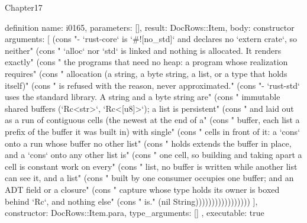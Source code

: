 \begin{lexlean}{Chapter17}
\begin{semanticmodule}
definition{
  name: i0165,
  parameters: [],
  result: DocRows::Item,
  body: constructor{
    arguments: [
      (cons "- `rust-core` is `#![no_std]` and declares no `extern crate`, so neither" (cons "  `alloc` nor `std` is linked and nothing is allocated. It renders exactly" (cons "  the programs that need no heap: a program whose realization requires" (cons "  allocation (a string, a byte string, a list, or a type that holds itself)" (cons "  is refused with the reason, never approximated." (cons "- `rust-std` uses the standard library. A string and a byte string are" (cons "  immutable shared buffers (`Rc<str>`, `Rc<[u8]>`); a list is persistent" (cons "  and laid out as a run of contiguous cells (the newest at the end of a" (cons "  buffer, each list a prefix of the buffer it was built in) with single" (cons "  cells in front of it: a `cons` onto a run whose buffer no other list" (cons "  holds extends the buffer in place, and a `cons` onto any other list is" (cons "  one cell, so building and taking apart a cell is constant work on every" (cons "  list, no buffer is written while another list can see it, and a list" (cons "  built by one consumer occupies one buffer; and an ADT field or a closure" (cons "  capture whose type holds its owner is boxed behind `Rc`, and nothing else" (cons "  is." (nil String)))))))))))))))))
    ],
    constructor: DocRows::Item.para,
    type_arguments: []
  },
  executable: true
}


\end{semanticmodule}
\end{lexlean}
